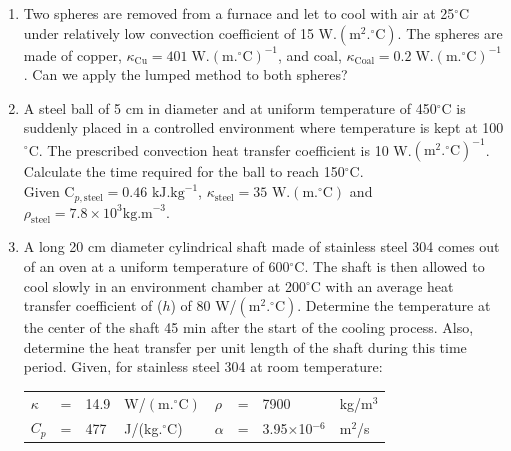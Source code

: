\documentclass[12pts,a4paper,amsmath,amssymb,floatfix]{article}%
\begin{document}
\begin{enumerate}[label=\bfseries Problem \arabic*:]

\item\label{Problem:Lumped_Example1} Two spheres are removed from a furnace and let to cool with air at 25$^{\circ}$C under relatively low convection coefficient of 15 W.$\left(\text{m}^{2}.^{\circ}\text{C}\right)$. The spheres are made of copper,  $\kappa_{\text{Cu}}=401\;\text{W.}\left(\text{m.}^{\circ}\text{C}\right)^{-1}$, and coal, $\kappa_{\text{Coal}}=0.2\;\text{W.}\left(\text{m.}^{\circ}\text{C}\right)^{-1}$. Can we apply the lumped method to both spheres?
\item\label{Problem:Lumped_Example2}A steel ball of 5 cm in diameter and at uniform temperature of 450$^{\circ}$C is suddenly placed in a controlled environment where temperature is kept at 100$^{\circ}$C.  The prescribed convection heat transfer coefficient is 10 W.$\left(\text{m}^{2}.^{\circ}\text{C}\right)^{-1}$. Calculate the time required for the ball to reach 150$^{\circ}$C. \\
Given C$_{p,\text{steel}} = 0.46\text{ kJ.kg}^{-1}$, $\kappa_{\text{steel}}=35\text{ W.}\left(\text{m.}^{\circ}\text{C}\right)$ and $\rho_{\text{steel}}=7.8\times 10^{3}\text{kg.m}^{-3}$.
\item\label{Problem:Analytical_Example3} A long 20 cm diameter cylindrical shaft made of stainless steel 304 comes out of an oven at a uniform temperature of 600$^{\circ}$C. The shaft is then allowed to cool slowly in an environment chamber at 200$^{\circ}$C with an average heat transfer coefficient of ($h$) of 80 W/$\left(\text{m}^{2}.^{\circ}\text{C}\right)$. Determine the temperature at the center of the shaft 45 min after the start of the cooling process. Also, determine the heat transfer per unit length of the shaft during this time period. Given, for stainless steel 304 at room temperature: 
\begin{center}
   \begin{tabular}{|l c l l | l c l l |}
     \hline
       $\kappa$ & = & 14.9 & W/$\left(\text{m.}^{\circ}\text{C}\right)$ & $\rho$   & = & 7900 & kg/m$^{3}$ \\
       $C_{p}$   & = & 477 & J/(kg.$^{\circ}$C)                          & $\alpha$ & = & 3.95$\times$10$^{-6}$ & m$^{2}$/s \\
     \hline
   \end{tabular}
\end{center}



\end{enumerate}
\end{document}

